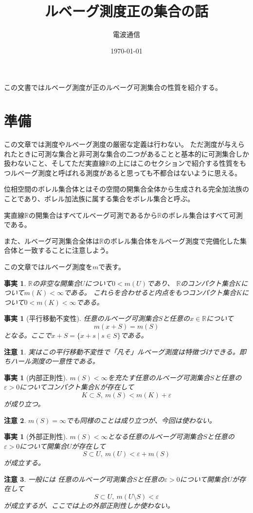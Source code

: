 \documentclass[leqno]{jsarticle}
\title{ルベーグ測度正の集合の話}
\author{電波通信}
\date{\today}
\newtheorem{fact}[thm]{事実}
\newtheorem*{cau}{注意}
\newcommand{\rr}{\mathbb{R}}
\newcommand{\ep}{\varepsilon}
\begin{document}
\maketitle
この文書ではルベーグ測度が正のルベーグ可測集合の性質を紹介する。
\section{準備}
この文章では測度やルベーグ測度の厳密な定義は行わない。
ただ測度が与えられたときに可測な集合と非可測な集合の二つがあることと基本的に可測集合しか扱わないこと、そしてただ実直線$\rr$の上にはこのセクションで紹介する性質をもつルベーグ測度と呼ばれる測度があると思っても不都合はないように思える。

位相空間のボレル集合体とはその空間の開集合全体から生成される完全加法族のことであり、ボレル加法族に属する集合をボレル集合と呼ぶ。

実直線$\rr$の開集合はすべてルベーグ可測であるから$\rr$のボレル集合はすべて可測である。

また、ルベーグ可測集合全体は$\rr$のボレル集合体をルベーグ測度で完備化した集合体と一致することに注意しよう。

この文章ではルベーグ測度を$m$で表す。

\begin{fact}
$\rr$の非空な開集合$U$について$0<m(U)$であり、
$\rr$のコンパクト集合$K$について$m(K)<\infty$である。
これらを合わせると内点をもつコンパクト集合$K$について$0<m(K)<\infty$である。
\end{fact}

\begin{fact}[平行移動不変性]
任意のルベーグ可測集合$S$と任意の$x\in \rr$について
\[
m(x+S)=m(S)
\]
となる。ここで$x+S=\{x+s\mid s\in S\}$である。
\end{fact}
\begin{cau}
実はこの平行移動不変性で「凡そ」ルベーグ測度は特徴づけできる。即ちハール測度の一意性である。
\end{cau}

\begin{fact}[内部正則性]
$m(S)<\infty$を充たす任意のルベーグ可測集合$S$と任意の$\ep>0$についてコンパクト集合$K$が存在して
\[
K\subset S,\ m(S)<m(K)+\ep
\]
が成り立つ。
\end{fact}

\begin{cau}
$m(S)=\infty$でも同様のことは成り立つが、今回は使わない。
\end{cau}

\begin{fact}[外部正則性]
$m(S)<\infty$となる任意のルベーグ可測集合$S$と任意の$\ep>0$について開集合$U$が存在して
\[
S\subset U,\ m(U)<\ep+m(S)
\]
が成立する。
\end{fact}
\begin{cau}
一般には
任意のルベーグ可測集合$S$と任意の$\ep>0$について開集合$U$が存在して
\[
S\subset U,\ m(U\setminus S)<\ep
\]
が成立するが、ここでは上の外部正則性しか使わない。
\end{cau}
\end{document}
